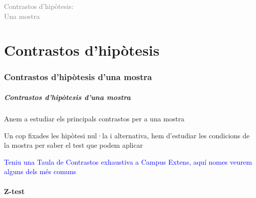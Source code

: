 \documentclass[12pt,t]{beamer}\usepackage[]{graphicx}\usepackage[]{color}
\title[\red{Matemàtiques III}]{}
\author[]{}
\date{}
\newcommand{\blue}[1]{\textcolor{blue}{#1}}
\newcommand{\gray}[1]{\textcolor{gray}{#1}}
\theoremstyle{plain}
\theoremstyle{definition}
\begin{document}
\beamertemplatedotitem

\lstset{breaklines=true}
\lstset{basicstyle=\ttfamily}


\begin{frame}
\vfill
\begin{center}
\gray{\LARGE Contrastos d'hipòtesis:}\\[1ex]

\gray{\LARGE Una mostra}
\end{center}
\vfill
\end{frame}


\part{Contrastos d'hipòtesis}

\section{Contrastos d'hipòtesis d'una mostra}

\begin{frame}
\frametitle{Contrastos d'hipòtesis d'una mostra}
Anem a estudiar els principals contrastos
per a una mostra
\medskip

Un cop fixades les hipòtesi nul·la i alternativa, hem d'estudiar les condicions de la mostra per saber el test
que podem aplicar
\medskip

\blue{Teniu una Taula de Contrastos exhaustiva a Campus Extens, aquí nomes veurem alguns dels més comuns}
\end{frame}


\subsection{Z-test}
\end{document}
